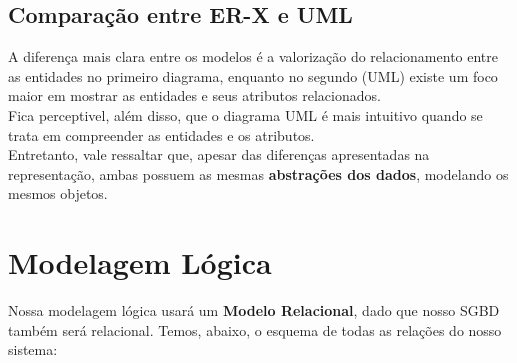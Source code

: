 \documentclass{article}
\begin{document}
	\subsection{Comparação entre ER-X e UML}
	A diferença mais clara entre os modelos é a valorização do relacionamento entre as entidades no primeiro diagrama, enquanto no segundo (UML) existe um foco maior em mostrar as entidades e seus atributos relacionados.\\
	Fica perceptivel, além disso, que o diagrama UML é mais intuitivo quando se trata em compreender as entidades e os atributos. \\
	Entretanto, vale ressaltar que, apesar das diferenças apresentadas na representação, ambas possuem as mesmas \textbf{abstrações dos dados}, modelando os mesmos objetos.

\section{Modelagem Lógica}
	Nossa modelagem lógica usará um \textbf{Modelo Relacional}, dado que nosso SGBD também será relacional. Temos, abaixo, o esquema de todas as relações do nosso sistema:\\
\end{document}
